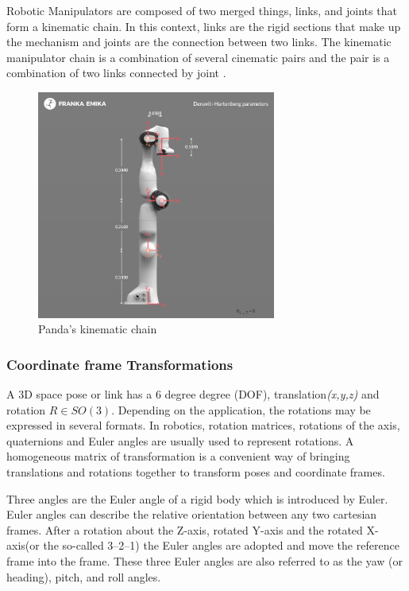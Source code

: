 Robotic Manipulators are composed of two merged things, links, and joints that form a kinematic chain. In this context, links are the rigid sections that make up the mechanism and joints are the connection between two links. The kinematic manipulator chain is a combination of several cinematic pairs and the pair is a combination of two links connected by joint \cite{al-naimi_robotics_nodate}.

\begin{figure}[h]
    \centering
    \includegraphics[width=0.7\textwidth]{graphics/pandakinematicchain.png}
    \caption{Panda’s kinematic chain \cite{noauthor_robot_nodate}}
    \label{fig:pandachain}
\end{figure}

\subsubsection*{Coordinate frame Transformations}
A 3D space pose or link has a 6 degree degree (DOF), translation\textit{(x,y,z)} and rotation $R \in SO(3)$. Depending on the application, the rotations may be expressed in several formats. 
In robotics, rotation matrices, rotations of the axis, quaternions and Euler angles are usually used to represent rotations.
A homogeneous matrix of transformation is a convenient way of bringing translations and rotations together to transform poses and coordinate frames\cite{cai_coordinate_2011}.

Three angles are the Euler angle of a rigid body which is introduced by Euler. Euler angles can describe the relative orientation between any two cartesian frames. After a rotation about the Z-axis, rotated Y-axis and the rotated X-axis(or the so-called 3–2–1) the Euler angles are adopted and move the reference frame into the frame. These three Euler angles are also referred to as the yaw (or heading), pitch, and roll angles\cite{cai_coordinate_2011}.

